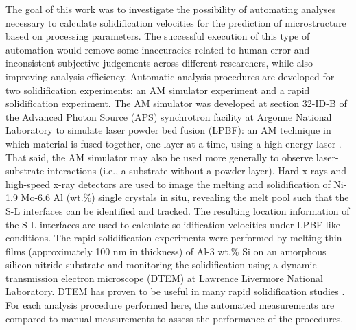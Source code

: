 The goal of this work was to investigate the possibility of automating
analyses necessary to calculate solidification velocities for the
prediction of microstructure based on processing parameters. The
successful execution of this type of automation would remove some inaccuracies
related to human error and inconsistent subjective judgements across
different researchers, while also improving analysis efficiency. Automatic
analysis procedures are developed for two solidification experiments: an
AM simulator experiment and a rapid solidification experiment. The AM
simulator was developed at section 32-ID-B of the Advanced Photon Source
(APS) synchrotron facility at Argonne National Laboratory \cite{Zhao2017}
to simulate laser powder bed fusion (LPBF): an AM
technique in which material is fused together, one layer at a time, using
a high-energy laser \cite{King2015}. That said, the AM simulator may also be
used more generally to observe laser-substrate interactions (i.e., a
substrate without a powder layer).
Hard x-rays and high-speed x-ray detectors are used
to image the melting and solidification of Ni-1.9 Mo-6.6 Al (wt.\%)
single crystals in situ, revealing the melt pool such
that the S-L interfaces can be identified and tracked. The resulting location
information of the S-L interfaces are used to calculate solidification
velocities under LPBF-like conditions. The rapid solidification
experiments were performed by melting thin films
(approximately 100 nm in thickness)
of Al-3 wt.\% Si on an amorphous silicon nitride substrate and
monitoring the solidification using a dynamic transmission electron
microscope (DTEM) at Lawrence Livermore National Laboratory. DTEM has
proven to be useful in many rapid solidification studies
\cite{LaGrange2006,LaGrange2008,Kim2008,Campbell2010,Kulovits2011,LaGrange2012,Santala2013,McKeown2014,Zweiacker2015,LaGrange2015,Roehling2017,Ji2023}.
For each analysis procedure performed here, the automated measurements
are compared to manual measurements to assess the performance of the procedures.

